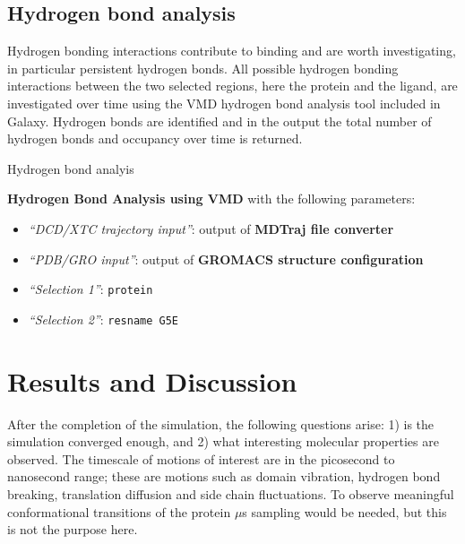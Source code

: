 \documentclass[twocolumn]{bmcart}%
\providecommand{\tightlist}{%
  \setlength{\itemsep}{0pt}\setlength{\parskip}{0pt}}
\begin{document}
\hypertarget{hydrogen-bond-analysis}{%
\subsection*{Hydrogen bond analysis}\label{hydrogen-bond-analysis}}

Hydrogen bonding interactions contribute to binding and are worth investigating, in particular persistent hydrogen bonds. All possible hydrogen bonding interactions between the two selected regions, here the protein and the ligand, are investigated over time using the VMD hydrogen bond analysis tool included in Galaxy. Hydrogen bonds are identified and in the output the total number of hydrogen bonds and  occupancy over time is returned.

\begin{handson_box_colour}{Hydrogen bond analyis}

  \textbf{Hydrogen Bond Analysis using VMD} with the following
  parameters:

  \begin{itemize}
  \tightlist
  \item
    \emph{``DCD/XTC trajectory input''}: output of
    \textbf{MDTraj file converter}
  \item
    \emph{``PDB/GRO input''}: output of \textbf{GROMACS
    structure configuration}
  \item
    \emph{``Selection 1''}: \texttt{protein}
  \item
    \emph{``Selection 2''}: \texttt{resname\ G5E}
  \end{itemize}



\end{handson_box_colour}




\hypertarget{resultsanddiscussion}{%
\section*{Results and Discussion}\label{resultsanddiscussion}}
After the completion of the simulation, the following questions arise: 1) is the simulation converged enough, and 2) what interesting molecular properties are observed. The timescale of motions of interest are in the picosecond to nanosecond range; these are motions such as domain vibration, hydrogen bond breaking, translation diffusion and side chain fluctuations. To observe meaningful conformational transitions of the protein $\mu$s sampling would be needed, but this is not the purpose here. 
\end{document}
